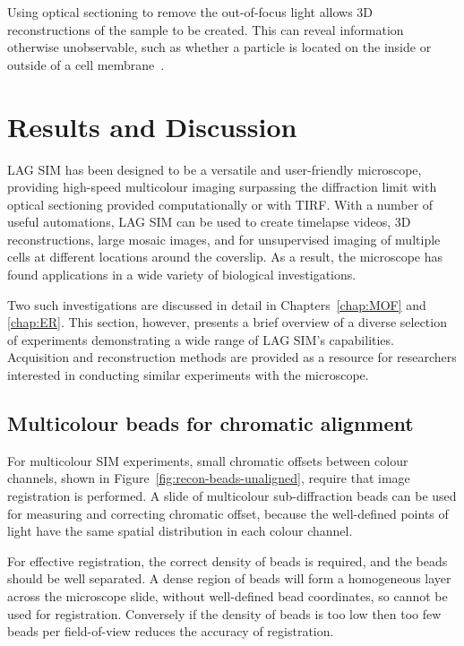 Using optical sectioning to remove the out-of-focus light allows 3D reconstructions of the sample to be created. 
This can reveal information otherwise unobservable, such as whether a particle is located on the inside or outside of a cell membrane~\cite{teplensky2017temperature}.


\section{Results and Discussion} \label{sec:sim-showcase}
LAG SIM has been designed to be a versatile and user-friendly microscope, providing high-speed multicolour imaging surpassing the diffraction limit with optical sectioning provided computationally or with TIRF.
With a number of useful automations, LAG SIM can be used to create timelapse videos, 3D reconstructions, large mosaic images, and for unsupervised imaging of multiple cells at different locations around the coverslip.
As a result, the microscope has found applications in a wide variety of biological investigations.

Two such investigations are discussed in detail in Chapters~\ref{chap:MOF} and \ref{chap:ER}.
This section, however, presents a brief overview of a diverse selection of experiments demonstrating a wide range of LAG SIM's capabilities.
Acquisition and reconstruction methods are provided as a resource for researchers interested in conducting similar experiments with the microscope.

\subsection{Multicolour beads for chromatic alignment}
For multicolour SIM experiments, small chromatic offsets between colour channels, shown in Figure~\ref{fig:recon-beads-unaligned}, require that image registration is performed.
A slide of multicolour sub-diffraction beads can be used for measuring and correcting chromatic offset, because the well-defined points of light have the same spatial distribution in each colour channel.

For effective registration, the correct density of beads is required, and the beads should be well separated.
A dense region of beads will form a homogeneous layer across the microscope slide, without well-defined bead coordinates, so cannot be used for registration.
Conversely if the density of beads is too low then too few beads per field-of-view reduces the accuracy of registration.

